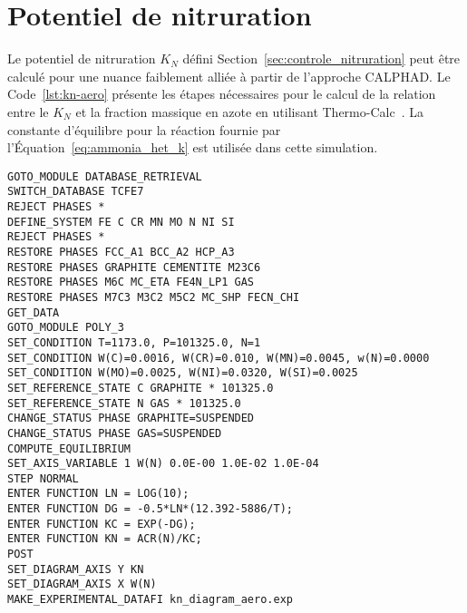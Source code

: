 \chapter{Potentiel de nitruration}
\label{an:nitriding-kn}

Le potentiel de nitruration $K_{N}$ défini Section~\ref{sec:controle_nitruration} peut être calculé pour une nuance faiblement alliée à partir de l'approche CALPHAD. Le Code~\ref{lst:kn-aero} présente les étapes nécessaires pour le calcul de la relation entre le $K_{N}$ et la fraction massique en azote en utilisant Thermo-Calc~\cite{Andersson2002,Borgenstam2000}. La constante d'équilibre pour la réaction  fournie par l'Équation~\ref{eq:ammonia_het_k} est utilisée dans cette simulation.

\begin{lstlisting}[caption={\label{lst:kn-aero}Calcul du potentiel de nitruration pour la nuance 16NiCrMo13.}]
GOTO_MODULE DATABASE_RETRIEVAL
SWITCH_DATABASE TCFE7
REJECT PHASES *
DEFINE_SYSTEM FE C CR MN MO N NI SI
REJECT PHASES *
RESTORE PHASES FCC_A1 BCC_A2 HCP_A3
RESTORE PHASES GRAPHITE CEMENTITE M23C6 
RESTORE PHASES M6C MC_ETA FE4N_LP1 GAS
RESTORE PHASES M7C3 M3C2 M5C2 MC_SHP FECN_CHI
GET_DATA
GOTO_MODULE POLY_3
SET_CONDITION T=1173.0, P=101325.0, N=1
SET_CONDITION W(C)=0.0016, W(CR)=0.010, W(MN)=0.0045, w(N)=0.0000
SET_CONDITION W(MO)=0.0025, W(NI)=0.0320, W(SI)=0.0025
SET_REFERENCE_STATE C GRAPHITE * 101325.0
SET_REFERENCE_STATE N GAS * 101325.0
CHANGE_STATUS PHASE GRAPHITE=SUSPENDED
CHANGE_STATUS PHASE GAS=SUSPENDED
COMPUTE_EQUILIBRIUM 
SET_AXIS_VARIABLE 1 W(N) 0.0E-00 1.0E-02 1.0E-04
STEP NORMAL
ENTER FUNCTION LN = LOG(10);
ENTER FUNCTION DG = -0.5*LN*(12.392-5886/T);
ENTER FUNCTION KC = EXP(-DG);
ENTER FUNCTION KN = ACR(N)/KC;
POST
SET_DIAGRAM_AXIS Y KN
SET_DIAGRAM_AXIS X W(N)
MAKE_EXPERIMENTAL_DATAFI kn_diagram_aero.exp
\end{lstlisting}